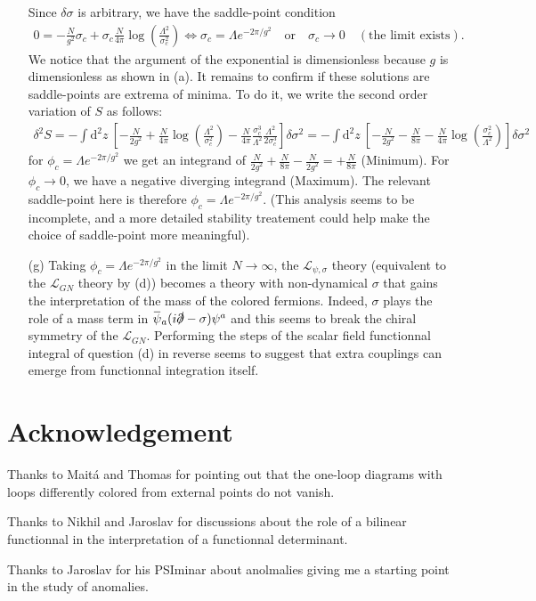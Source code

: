 \documentclass[10pt, a4paper]{article}
\begin{document}
\begin{enumerate}
  Since $\delta \sigma$ is arbitrary, we have the saddle-point condition 
  \begin{align*}
    0 = - \frac{N}{g^2} \sigma_c + \sigma_c \frac{N}{4 \pi} \log \left(\frac{\Lambda^2}{\sigma_c^2}\right) \iff \sigma_c = \Lambda e^{-2\pi/g^2} \quad  \text{or} \quad \sigma_c \to 0 \quad (\text{the limit exists}).
  \end{align*}
  We notice that the argument of the exponential is dimensionless because $g$ is dimensionless as shown in (a). It remains to confirm if these solutions are saddle-points are extrema of minima. To do it, we write the second order variation of $S$ as follows:
  \begin{align*}
    \delta^2 S = -\int \text{d}^2 z\ \left[-\frac{N}{2g^2} + \frac{N}{4 \pi} \log \left(\frac{\Lambda^2}{\sigma_c^2}\right) - \frac{N}{4 \pi} \frac{\sigma_c^3}{\Lambda^2} \frac{\Lambda^2}{2 \sigma_c^3} \right] \delta \sigma^2 = -\int \text{d}^2 z\ \left[-\frac{N}{2g^2} - \frac{N}{8 \pi} - \frac{N}{4 \pi} \log \left(\frac{\sigma_c^2}{\Lambda^2}\right) \right] \delta \sigma^2
  \end{align*}
  for $\phi_c = \Lambda e^{-2\pi/g^2}$ we get an integrand of $\frac{N}{2g^2} + \frac{N}{8 \pi} - \frac{N}{2 g^2} = + \frac{N}{8 \pi}$ (Minimum). For $\phi_c \to 0$, we have a negative diverging integrand (Maximum). The relevant saddle-point here is therefore $\phi_c = \Lambda e^{-2\pi/g^2}$. (This analysis seems to be incomplete, and a more detailed stability treatement could help make the choice of saddle-point more meaningful). 
  \item[(g)] Taking $\phi_c = \Lambda e^{-2\pi/g^2}$ in the limit $N \to \infty$, the $\mathcal{L}_{\psi, \sigma}$ theory (equivalent to the $\mathcal{L}_{GN}$ theory by (d)) becomes a theory with non-dynamical $\sigma$ that gains the interpretation of the mass of the colored fermions. Indeed, $\sigma$ plays the role of a mass term in $\bar{\psi}_a(i\slashed{\partial}-\sigma) \psi^a$ and this seems to break the chiral symmetry of the $\mathcal{L}_{GN}$. Performing the steps of the scalar field functionnal integral of question (d) in reverse seems to suggest that extra couplings can emerge from functionnal integration itself. 
\end{enumerate}



\section{Acknowledgement}
Thanks to Maitá and Thomas for pointing out that the one-loop diagrams with loops differently colored from external points do not vanish. 

Thanks to Nikhil and Jaroslav for discussions about the role of a bilinear functionnal in the interpretation of a functionnal determinant. 

Thanks to Jaroslav for his PSIminar about anolmalies giving me a starting point in the study of anomalies. 


\makereferences


\end{document}
